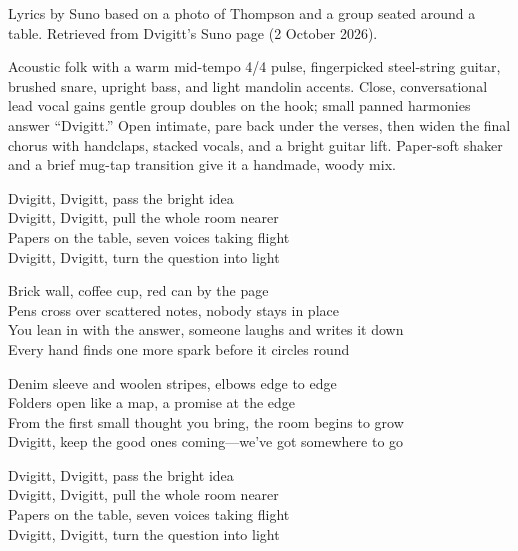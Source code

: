 
\begin{notes}
Lyrics by Suno based on a photo of Thompson and a group seated around a table. Retrieved from Dvigitt’s Suno page (2 October 2026).
\end{notes}
\begin{style}
Acoustic folk with a warm mid-tempo 4/4 pulse, fingerpicked steel-string guitar, brushed snare, upright bass, and light mandolin accents. Close, conversational lead vocal gains gentle group doubles on the hook; small panned harmonies answer “Dvigitt.” Open intimate, pare back under the verses, then widen the final chorus with handclaps, stacked vocals, and a bright guitar lift. Paper-soft shaker and a brief mug-tap transition give it a handmade, woody mix.
\end{style}
\begin{lyrics}
Dvigitt, Dvigitt, pass the bright idea\\
Dvigitt, Dvigitt, pull the whole room nearer\\
Papers on the table, seven voices taking flight\\
Dvigitt, Dvigitt, turn the question into light

Brick wall, coffee cup, red can by the page\\
Pens cross over scattered notes, nobody stays in place\\
You lean in with the answer, someone laughs and writes it down\\
Every hand finds one more spark before it circles round

Denim sleeve and woolen stripes, elbows edge to edge\\
Folders open like a map, a promise at the edge\\
From the first small thought you bring, the room begins to grow\\
Dvigitt, keep the good ones coming—we’ve got somewhere to go

Dvigitt, Dvigitt, pass the bright idea\\
Dvigitt, Dvigitt, pull the whole room nearer\\
Papers on the table, seven voices taking flight\\
Dvigitt, Dvigitt, turn the question into light
\end{lyrics}

